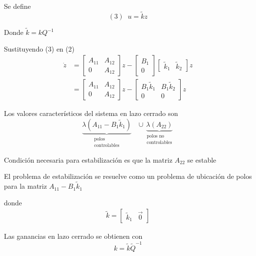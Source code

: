 Se define 
\[
    (3) \;\; u = \tilde{k}z
\]

Donde \( \tilde{k} = kQ^{-1} \)

Sustituyendo (3)  en (2)
\[
    \begin{split}
        \dot{z} & = 
        \begin{bmatrix}
            A_{11} & A_{12} \\
            0 & A_{12}
        \end{bmatrix} z
        -
        \begin{bmatrix}
            B_{1} \\ 0
        \end{bmatrix}
        \begin{bmatrix}
            \tilde{k}_{1} & \tilde{k}_{2}
        \end{bmatrix} z \\
        & = 
        \begin{bmatrix}
            A_{11} & A_{12} \\
            0 & A_{12}
        \end{bmatrix} z
        -
        \begin{bmatrix}
            B_{1} \tilde{k}_{1} & B_{1} \tilde{k}_{2} \\
            0 & 0
        \end{bmatrix} z
    \end{split}
\]

Los valores característicos del sistema en lazo cerrado son 
\[
    \underbrace{ \lambda(A_{11} - B_{1}\tilde{k}_{1}) }_
        {
        \begin{matrix}
            \text{polos} \\
            \text{controlables}
        \end{matrix}
        } \;\;\;\cup
    \underbrace{ \lambda(A_{22}) }_
        {
        \begin{matrix}
            \text{polos no} \\
            \text{controlables}
        \end{matrix}
        }
\]

Condición necesaria para estabilización es que la matriz \( A_{22} \) se estable

El problema de estabilización se resuelve como un problema de ubicación de polos para la matriz \( A_{11}-B_{1}\tilde{k}_{1} \)

donde 
\[
    \begin{split}
        \tilde{k} = 
        \begin{bmatrix}
            \tilde{k}_{1} & \Vec{0}
        \end{bmatrix}
    \end{split}
\]

Las ganancias en lazo cerrado se obtienen con
\[
    k = \tilde{k} \tilde{Q}^{-1}
\]